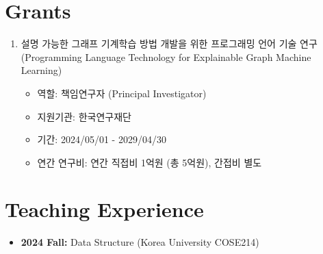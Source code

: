 \documentclass[letterpaper,11pt]{article}
\begin{document}
\section{Grants}
\begin{enumerate}
  \item{설명 가능한 그래프 기계학습 방법 개발을 위한 프로그래밍 언어 기술 연구 (Programming Language Technology for Explainable Graph Machine Learning)
  \begin{itemize}
    \item {역할: 책임연구자 (Principal Investigator)}
    \item {지원기관: 한국연구재단}
    \item {기간: 2024/05/01 - 2029/04/30}
    \item {연간 연구비: 연간 직접비 1억원 (총 5억원), 간접비 별도}
  \end{itemize}
}
\end{enumerate}

\section{Teaching Experience}
\begin{itemize}
  \item{{\bf 2024 Fall:} Data Structure (Korea University COSE214)}
\end{itemize}


\end{document}
